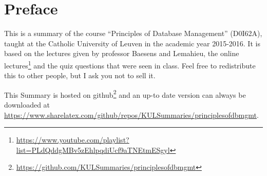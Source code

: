 \section*{Preface}
This is a summary of the course ``Principles of Database Management'' (D0I62A), taught at the Catholic University of Leuven in the academic year 2015-2016. It is based on the lectures given by professor Baesens and Lemahieu, the online lectures\footnote{\url{https://www.youtube.com/playlist?list=PLdQddgMBv5zEhlpqdiUcf9aTNEtmESgyl}} and the quiz questions that were seen in class. Feel free to redistribute this to other people, but I ask you not to sell it.

This Summary is hosted on github\footnote{\url{https://github.com/KULSummaries/principlesofdbmgmt}} and an up-to date version can always be downloaded at \url{https://www.sharelatex.com/github/repos/KULSummaries/principlesofdbmgmt}.
